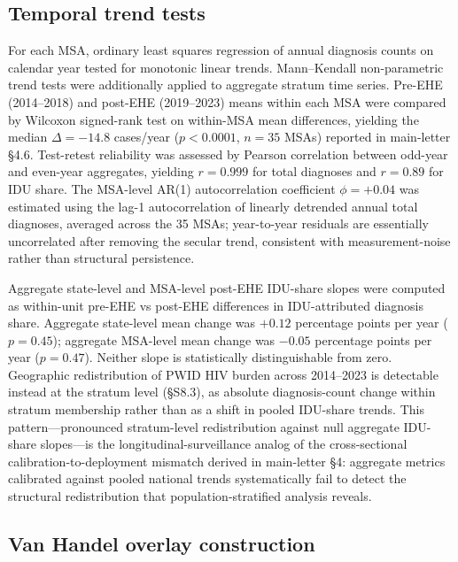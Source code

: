 \documentclass[11pt]{article}
\begin{document}
\subsection{Temporal trend tests}

For each MSA, ordinary least squares regression of annual diagnosis counts on calendar year tested for monotonic linear trends. Mann--Kendall non-parametric trend tests were additionally applied to aggregate stratum time series. Pre-EHE (2014--2018) and post-EHE (2019--2023) means within each MSA were compared by Wilcoxon signed-rank test on within-MSA mean differences, yielding the median $\Delta = -14.8$ cases/year ($p < 0.0001$, $n = 35$ MSAs) reported in main-letter §4.6. Test-retest reliability was assessed by Pearson correlation between odd-year and even-year aggregates, yielding $r = 0.999$ for total diagnoses and $r = 0.89$ for IDU share. The MSA-level AR(1) autocorrelation coefficient $\phi = +0.04$ was estimated using the lag-1 autocorrelation of linearly detrended annual total diagnoses, averaged across the 35 MSAs; year-to-year residuals are essentially uncorrelated after removing the secular trend, consistent with measurement-noise rather than structural persistence.

Aggregate state-level and MSA-level post-EHE IDU-share slopes were computed as within-unit pre-EHE vs post-EHE differences in IDU-attributed diagnosis share. Aggregate state-level mean change was $+0.12$ percentage points per year ($p = 0.45$); aggregate MSA-level mean change was $-0.05$ percentage points per year ($p = 0.47$). Neither slope is statistically distinguishable from zero. Geographic redistribution of PWID HIV burden across 2014--2023 is detectable instead at the stratum level (§S8.3), as absolute diagnosis-count change within stratum membership rather than as a shift in pooled IDU-share trends. This pattern---pronounced stratum-level redistribution against null aggregate IDU-share slopes---is the longitudinal-surveillance analog of the cross-sectional calibration-to-deployment mismatch derived in main-letter §4: aggregate metrics calibrated against pooled national trends systematically fail to detect the structural redistribution that population-stratified analysis reveals.

\subsection{Van Handel overlay construction}
\end{document}
